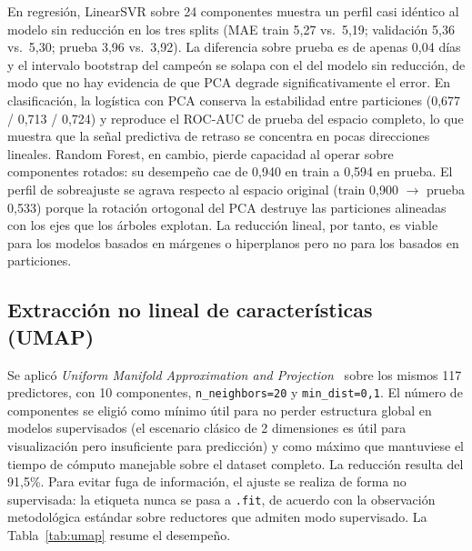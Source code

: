 \documentclass[journal]{IEEEtran}
\begin{document}
En regresión, LinearSVR sobre 24 componentes muestra un perfil casi idéntico al modelo sin reducción en los tres splits (MAE train 5,27 vs.\ 5,19; validación 5,36 vs.\ 5,30; prueba 3,96 vs.\ 3,92). La diferencia sobre prueba es de apenas 0,04 días y el intervalo bootstrap del campeón se solapa con el del modelo sin reducción, de modo que no hay evidencia de que PCA degrade significativamente el error. En clasificación, la logística con PCA conserva la estabilidad entre particiones (0,677 / 0,713 / 0,724) y reproduce el ROC-AUC de prueba del espacio completo, lo que muestra que la señal predictiva de retraso se concentra en pocas direcciones lineales. Random Forest, en cambio, pierde capacidad al operar sobre componentes rotados: su desempeño cae de 0,940 en train a 0,594 en prueba. El perfil de sobreajuste se agrava respecto al espacio original (train 0,900 $\to$ prueba 0,533) porque la rotación ortogonal del PCA destruye las particiones alineadas con los ejes que los árboles explotan. La reducción lineal, por tanto, es viable para los modelos basados en márgenes o hiperplanos pero no para los basados en particiones.

\subsection{Extracción no lineal de características (UMAP)}
\label{sec:umap}

Se aplicó \textit{Uniform Manifold Approximation and Projection}~\cite{mcinnes2018umap} sobre los mismos 117 predictores, con 10 componentes, \texttt{n\_neighbors=20} y \texttt{min\_dist=0{,}1}. El número de componentes se eligió como mínimo útil para no perder estructura global en modelos supervisados (el escenario clásico de 2 dimensiones es útil para visualización pero insuficiente para predicción) y como máximo que mantuviese el tiempo de cómputo manejable sobre el dataset completo. La reducción resulta del 91,5\%. Para evitar fuga de información, el ajuste se realiza de forma no supervisada: la etiqueta nunca se pasa a \texttt{.fit}, de acuerdo con la observación metodológica estándar sobre reductores que admiten modo supervisado. La Tabla~\ref{tab:umap} resume el desempeño.
\end{document}
